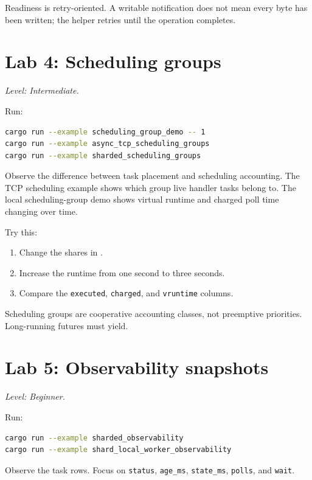 Readiness is retry-oriented. A writable notification does not mean
every byte has been written; the helper retries until the operation completes.

\section{Lab 4: Scheduling groups}

\textit{Level: Intermediate.}

Run:

\begin{lstlisting}[language=bash,caption={Scheduling group demos}]
cargo run --example scheduling_group_demo -- 1
cargo run --example async_tcp_scheduling_groups
cargo run --example sharded_scheduling_groups
\end{lstlisting}

Observe the difference between task placement and scheduling accounting. The
TCP scheduling example shows which group live handler tasks belong to. The
local scheduling-group demo shows virtual runtime and charged poll time
changing over time.

Try this:

\begin{enumerate}
    \item Change the shares in .
    \item Increase the runtime from one second to three seconds.
    \item Compare the \texttt{executed}, \texttt{charged}, and
          \texttt{vruntime} columns.
\end{enumerate}

Scheduling groups are cooperative accounting classes, not
preemptive priorities. Long-running futures must yield.

\section{Lab 5: Observability snapshots}

\textit{Level: Beginner.}

Run:

\begin{lstlisting}[language=bash,caption={Observability examples}]
cargo run --example sharded_observability
cargo run --example shard_local_worker_observability
\end{lstlisting}

Observe the task rows. Focus on \texttt{status}, \texttt{age\_ms},
\texttt{state\_ms}, \texttt{polls}, and \texttt{wait}.

